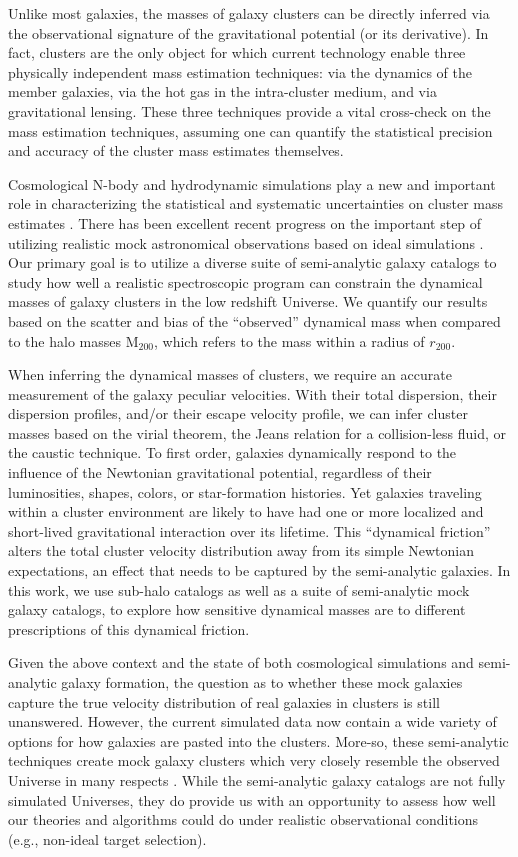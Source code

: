 \documentclass[iop]{emulateapj}
\begin{document}
Unlike most galaxies, the masses of galaxy clusters can be directly inferred via the observational signature of the gravitational potential (or its derivative). In fact, clusters are the only object for which current technology enable three physically independent mass estimation techniques: via the dynamics of the member galaxies, via the hot gas in the intra-cluster medium, and via gravitational lensing. These three techniques provide a vital cross-check on the mass estimation techniques, assuming one can quantify the statistical precision and accuracy of the cluster mass estimates themselves. 

Cosmological N-body and hydrodynamic simulations play a new and important role in characterizing the statistical and systematic uncertainties on cluster mass estimates \citep{Nagai07, Becker11}. There has been excellent recent progress on the important step of utilizing realistic mock astronomical observations based on ideal simulations \citep{Meneghetti12, Rasia12, Saro12}. Our primary goal is to utilize a diverse suite of semi-analytic galaxy catalogs to study how well a realistic spectroscopic program can constrain the dynamical masses of galaxy clusters in the low redshift Universe. We quantify our results based on the scatter and bias of the ``observed'' dynamical mass when compared to the halo masses M$_{200}$, which refers to the mass within a radius of $r_{200}$.

When inferring the dynamical masses of clusters, we require an accurate measurement of the galaxy peculiar velocities. With their total dispersion, their dispersion profiles, and/or their escape velocity profile, we can infer cluster masses based on the virial theorem, the Jeans relation for a collision-less fluid, or the caustic technique. To first order, galaxies dynamically respond to the influence of the Newtonian gravitational potential, regardless of their luminosities, shapes, colors, or star-formation histories. Yet galaxies traveling within a cluster environment are likely to have had one or more localized and short-lived gravitational interaction over its lifetime. This ``dynamical friction'' alters the total cluster velocity distribution away from its simple Newtonian expectations, an effect that needs to be captured by the semi-analytic galaxies. In this work, we use sub-halo catalogs as well as a suite of semi-analytic mock galaxy catalogs, to explore how sensitive dynamical masses are to different prescriptions of this dynamical friction.

Given the above context and the state of both cosmological simulations and semi-analytic galaxy formation, the question as to whether these mock galaxies capture the true velocity distribution of real galaxies in clusters is still unanswered. However, the current simulated data now contain a wide variety of options for how galaxies are pasted into the clusters. More-so, these semi-analytic techniques create mock galaxy clusters which very closely resemble the observed Universe in many respects \citep{Guo11}. While the semi-analytic galaxy catalogs are not fully simulated Universes, they do provide us with an opportunity to assess how well our theories and algorithms could do under realistic observational conditions (e.g., non-ideal target selection). 
\end{document}
